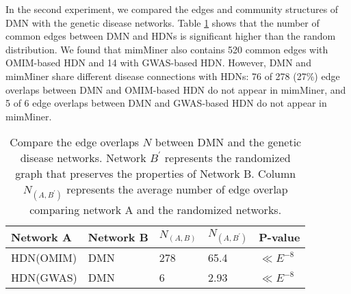 In the second experiment, we compared the edges and community structures of DMN with the genetic disease networks.
Table \ref{edgecompare} shows that the number of common edges between DMN and HDNs is significant higher than the random distribution.
We found that mimMiner also contains 520 common edges with OMIM-based HDN and 14 with GWAS-based HDN.
However, DMN and mimMiner share different disease connections with HDNs:
76 of 278 (27\%) edge overlaps between DMN and OMIM-based HDN do not appear in mimMiner,
and 5 of 6 edge overlaps between DMN and GWAS-based HDN do not appear in mimMiner.
\begin{table}[h!]
\caption{Compare the edge overlaps $N$ between DMN and the genetic disease networks. Network $B^{'}$ represents the randomized graph that preserves the properties of Network B. Column $N_{(A,B^{'})}$ represents the average number of edge overlap comparing network A and the randomized networks.\label{edgecompare}}
\begin{tabular}{l l l l l}
\\\hline
Network A & Network B &$N_{(A,B)}$  & $N_{(A,B^{'})}$  & P-value\\\hline
HDN(OMIM)        & DMN       &278	      &65.4	            &$\ll E^{-8}$\\\hline
HDN(GWAS)        & DMN       &6	      &2.93	            &$\ll E^{-8}$\\\hline
\end{tabular}
\end{table}





